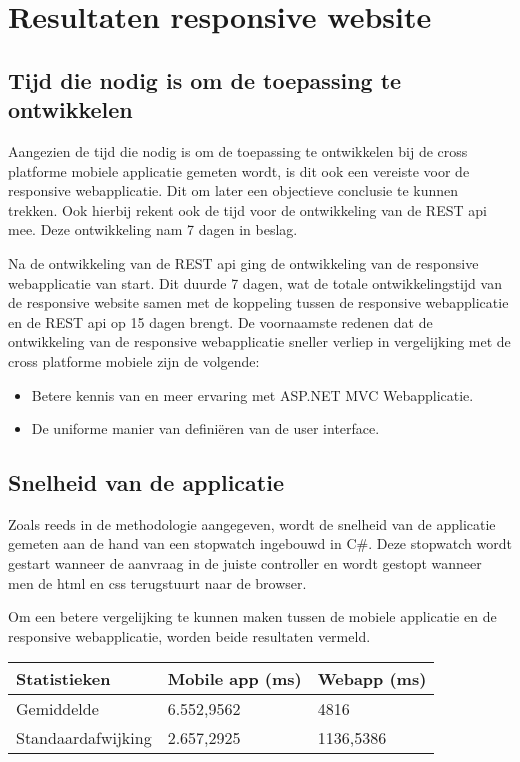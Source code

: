 \chapter{Resultaten responsive website}
\label{ch:resultatenresponsivewebsite}
\section{Tijd die nodig is om de toepassing te ontwikkelen}
Aangezien de tijd die nodig is om de toepassing te ontwikkelen bij de cross platforme mobiele applicatie gemeten wordt,
is dit ook een vereiste voor de responsive webapplicatie. Dit om later een objectieve conclusie te kunnen trekken.
Ook hierbij rekent ook de tijd voor de ontwikkeling van de REST api mee. Deze ontwikkeling nam 7 dagen in beslag.

Na de ontwikkeling van de REST api ging de ontwikkeling van de responsive webapplicatie van start.
Dit duurde 7 dagen, wat de totale ontwikkelingstijd van de responsive website samen met de koppeling tussen de responsive webapplicatie
en de REST api op 15 dagen brengt. De voornaamste redenen dat de ontwikkeling van de responsive webapplicatie sneller verliep in vergelijking met de cross platforme mobiele zijn de volgende:
\begin{itemize}
  \item Betere kennis van en meer ervaring met ASP.NET MVC Webapplicatie.
  \item De uniforme manier van definiëren van de user interface.
\end{itemize}

\section{Snelheid van de applicatie}
Zoals reeds in de methodologie aangegeven, wordt de snelheid van de applicatie gemeten aan de hand van een stopwatch ingebouwd in C\#.
Deze stopwatch wordt gestart wanneer de aanvraag in de juiste controller en wordt gestopt wanneer men de html en css terugstuurt naar de browser.

Om een betere vergelijking te kunnen maken tussen de mobiele applicatie en de responsive webapplicatie, worden beide resultaten vermeld.

\begin{center}
\begin{tabular}{| l | l | l | }
  \hline
  Statistieken & Mobile app (ms) & Webapp (ms) \\ \hline
  Gemiddelde & 6.552,9562 & 4816 \\ \hline
  Standaardafwijking & 2.657,2925 & 1136,5386 \\
  \hline
\end{tabular}
\end{center}

